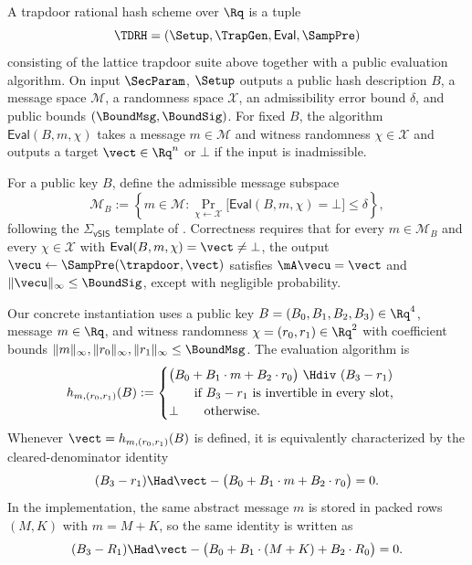 \begin{definition}\label{def:bbs-rational-hash}
A trapdoor rational hash scheme over \(\Rq\) is a tuple
\[
  \TDRH=(\Setup,\TrapGen,\mathsf{Eval},\SampPre)
\]
consisting of the lattice trapdoor suite above together with a public evaluation algorithm. On input \(\SecParam\),
\(\Setup\) outputs a public hash description \(B\), a message space \(\mathcal{M}\), a randomness space \(\mathcal{X}\), an
admissibility error bound \(\delta\), and public bounds \((\BoundMsg,\BoundSig)\). For fixed \(B\), the algorithm
\(\mathsf{Eval}(B,m,\chi)\) takes a message \(m\in\mathcal{M}\) and witness randomness \(\chi\in\mathcal{X}\) and outputs a
target \(\vect\in\Rq^n\) or \(\bot\) if the input is inadmissible.

For a public key \(B\), define the admissible message subspace
\[
  \mathcal{M}_B:=\left\{m\in\mathcal{M} :
  \Pr_{\chi\gets \mathcal{X}}\big[\mathsf{Eval}(B,m,\chi)=\bot\big]\le \delta\right\},
\]
following the \(\Sigma_{\mathsf{vSIS}}\) template of \cite[Section~4.1]{EPRINT:DKLW25}. Correctness requires that for
every \(m\in\mathcal{M}_B\) and every \(\chi\in\mathcal{X}\) with \(\mathsf{Eval}(B,m,\chi)=\vect\neq\bot\), the output
\(\vecu\gets \SampPre(\trapdoor,\vect)\) satisfies \(\mA\vecu=\vect\) and \(\|\vecu\|_\infty\le \BoundSig\), except with
negligible probability.
\end{definition}

\begin{definition}\label{def:rational-hash}
Our concrete instantiation uses a public key \(B=(B_0,B_1,B_2,B_3)\in\Rq^4\), message \(m\in\Rq\), and witness
randomness \(\chi=(r_0,r_1)\in\Rq^2\) with coefficient bounds
\(\|m\|_\infty,\|r_0\|_\infty,\|r_1\|_\infty\le \BoundMsg\). The evaluation algorithm is
\[
  h_{m,(r_0,r_1)}(B):=
  \begin{cases}
    \bigl(B_0+B_1\cdot m+B_2\cdot r_0\bigr)\ \Hdiv\ (B_3-r_1)\\
    \qquad\text{if \(B_3-r_1\) is invertible in every slot,}\\
    \bot \qquad\text{otherwise.}
  \end{cases}
\]
Whenever \(\vect=h_{m,(r_0,r_1)}(B)\) is defined, it is equivalently characterized by the cleared-denominator identity
\begin{equation}\label{eq:hash-cleared}
  (B_3-r_1)\Had \vect-\bigl(B_0+B_1\cdot m+B_2\cdot r_0\bigr)=0.
\end{equation}
In the implementation, the same abstract message \(m\) is stored in packed rows \((M,K)\) with \(m=M+K\), so
the same identity is written as
\[
  (B_3-R_1)\Had \vect-\bigl(B_0+B_1\cdot(M+K)+B_2\cdot R_0\bigr)=0.
\]
\end{definition}

